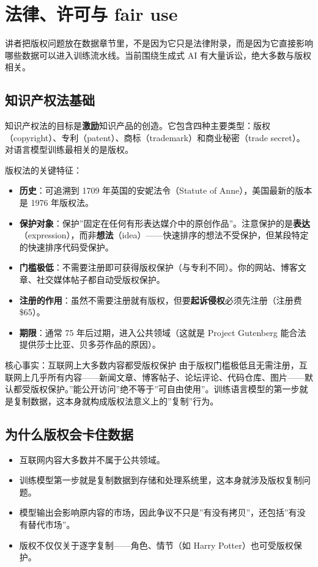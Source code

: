 \section{法律、许可与 fair use}

讲者把版权问题放在数据章节里，不是因为它只是法律附录，而是因为它直接影响哪些数据可以进入训练流水线。当前围绕生成式 AI 有大量诉讼，绝大多数与版权相关。

\subsection{知识产权法基础}

知识产权法的目标是\textbf{激励}知识产品的创造。它包含四种主要类型：版权（copyright）、专利（patent）、商标（trademark）和商业秘密（trade secret）。对语言模型训练最相关的是版权。

版权法的关键特征：
\begin{itemize}
    \item \textbf{历史}：可追溯到 1709 年英国的安妮法令（Statute of Anne），美国最新的版本是 1976 年版权法。
    \item \textbf{保护对象}：保护”固定在任何有形表达媒介中的原创作品”。注意保护的是\textbf{表达}（expression），而非\textbf{想法}（idea）——快速排序的想法不受保护，但某段特定的快速排序代码受保护。
    \item \textbf{门槛极低}：不需要注册即可获得版权保护（与专利不同）。你的网站、博客文章、社交媒体帖子都自动受版权保护。
    \item \textbf{注册的作用}：虽然不需要注册就有版权，但要\textbf{起诉侵权}必须先注册（注册费 \$65）。
    \item \textbf{期限}：通常 75 年后过期，进入公共领域（这就是 Project Gutenberg 能合法提供莎士比亚、贝多芬作品的原因）。
\end{itemize}

\begin{warningbox}{核心事实：互联网上大多数内容都受版权保护}
由于版权门槛极低且无需注册，互联网上几乎所有内容——新闻文章、博客帖子、论坛评论、代码仓库、图片——默认都受版权保护。”能公开访问”绝不等于”可自由使用”。训练语言模型的第一步就是复制数据，这本身就构成版权法意义上的”复制”行为。
\end{warningbox}

\subsection{为什么版权会卡住数据}

\begin{itemize}
    \item 互联网内容大多数并不属于公共领域。
    \item 训练模型第一步就是复制数据到存储和处理系统里，这本身就涉及版权复制问题。
    \item 模型输出会影响原内容的市场，因此争议不只是”有没有拷贝”，还包括”有没有替代市场”。
    \item 版权不仅仅关于逐字复制——角色、情节（如 Harry Potter）也可受版权保护。
\end{itemize}

